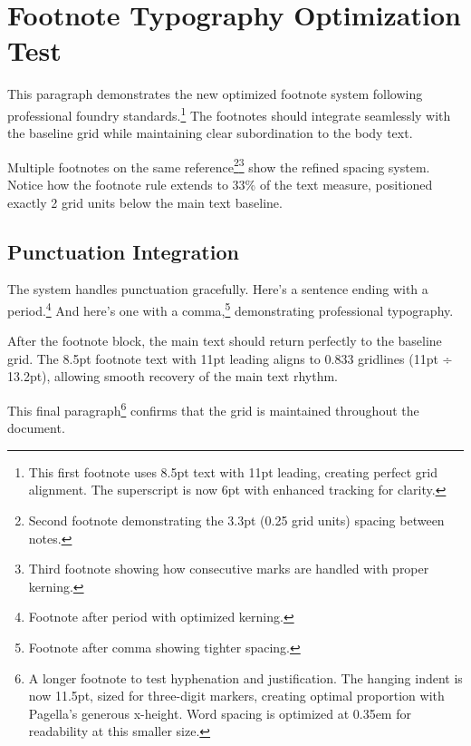 \documentclass[11pt]{article}
\begin{document}
\section{Footnote Typography Optimization Test}

This paragraph demonstrates the new optimized footnote system following professional foundry standards.\footnote{This first footnote uses 8.5pt text with 11pt leading, creating perfect grid alignment. The superscript is now 6pt with enhanced tracking for clarity.} The footnotes should integrate seamlessly with the baseline grid while maintaining clear subordination to the body text.

Multiple footnotes on the same reference\footnote{Second footnote demonstrating the 3.3pt (0.25 grid units) spacing between notes.}\footnote{Third footnote showing how consecutive marks are handled with proper kerning.} show the refined spacing system. Notice how the footnote rule extends to 33\% of the text measure, positioned exactly 2 grid units below the main text baseline.

\subsection{Punctuation Integration}

The system handles punctuation gracefully. Here's a sentence ending with a period.\footnote{Footnote after period with optimized kerning.} And here's one with a comma,\footnote{Footnote after comma showing tighter spacing.} demonstrating professional typography.

 After the footnote block, the main text should return perfectly to the baseline grid. The 8.5pt footnote text with 11pt leading aligns to 0.833 gridlines (11pt ÷ 13.2pt), allowing smooth recovery of the main text rhythm.

This final paragraph\footnote{A longer footnote to test hyphenation and justification. The hanging indent is now 11.5pt, sized for three-digit markers, creating optimal proportion with Pagella's generous x-height. Word spacing is optimized at 0.35em for readability at this smaller size.} confirms that the grid is maintained throughout the document.
\end{document}
